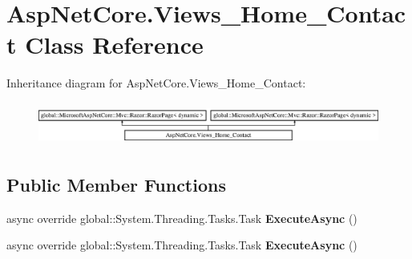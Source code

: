 \hypertarget{class_asp_net_core_1_1_views___home___contact}{}\section{Asp\+Net\+Core.\+Views\+\_\+\+Home\+\_\+\+Contact Class Reference}
\label{class_asp_net_core_1_1_views___home___contact}
Inheritance diagram for Asp\+Net\+Core.\+Views\+\_\+\+Home\+\_\+\+Contact\+:\begin{figure}[H]
\begin{center}
\leavevmode
\includegraphics[height=1.432225cm]{class_asp_net_core_1_1_views___home___contact}
\end{center}
\end{figure}
\subsection*{Public Member Functions}
\begin{DoxyCompactItemize}
\item 
\mbox{\label{class_asp_net_core_1_1_views___home___contact_a92aa0f485a3ebbc1d1171925e20288c8}} 
async override global\+::\+System.\+Threading.\+Tasks.\+Task {\bfseries Execute\+Async} ()
\item 
\mbox{\label{class_asp_net_core_1_1_views___home___contact_a92aa0f485a3ebbc1d1171925e20288c8}} 
async override global\+::\+System.\+Threading.\+Tasks.\+Task {\bfseries Execute\+Async} ()
\end{DoxyCompactItemize}
